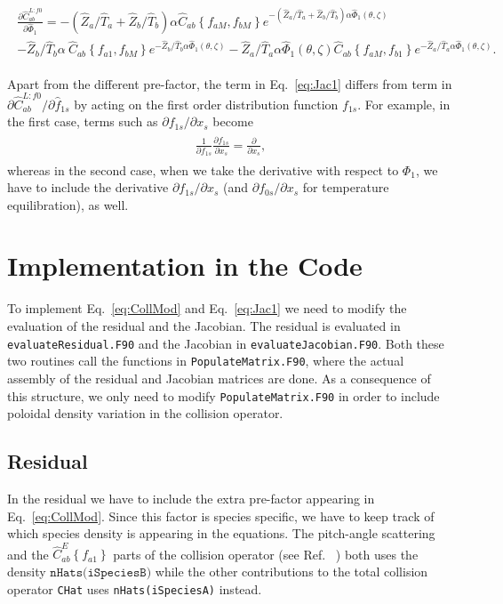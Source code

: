\documentclass[12pt]{article}
\newcommand{\eq}[1]{\begin{align*}\begin{gathered}#1\end{gathered}\end{align*}}
\newcommand{\eqre}[1]{\begin{align}\begin{gathered}#1\end{gathered}\end{align}}
\begin{document}
\eqre{
\label{eq:Jac1}
\frac{\partial \hat C_{ab}^{L:f0}}{\partial \hat \Phi_1} = -\left(\hat Z_a/\hat T_a + \hat Z_b/\hat T_b\right) \alpha \hat C_{ab}\left\{f_{aM},f_{bM}\right\}e^{-\left(\hat Z_a/\hat T_a + \hat Z_b/\hat T_b\right) \alpha\hat\Phi_1(\theta,\zeta)}  \\ -\hat Z_b/\hat T_b \alpha\ \hat C_{ab}\left\{f_{a1},f_{bM}\right\}e^{-\hat Z_b/\hat T_b \alpha\hat\Phi_1(\theta,\zeta)}  - \hat Z_a/\hat T_a\alpha\hat\Phi_1(\theta,\zeta) \hat C_{ab}\left\{f_{aM},f_{b1}\right\}e^{-\hat Z_a/\hat T_a\alpha\hat\Phi_1(\theta,\zeta)}.
}

\noindent
Apart from the different pre-factor, the term in Eq.~\eqref{eq:Jac1} differs from term in $\partial \hat C_{ab}^{L:f0}/\partial \hat f_{1s}$ by acting on the first order distribution function $f_{1s}$. For example, in the first case, terms such as $\partial f_{1s}/\partial x_s$ become 
\eq{
\frac{1}{\partial f_{1s}}\frac{\partial f_{1s}}{\partial x_s} = \frac{\partial}{\partial x_s},
}
whereas in the second case, when we take the derivative with respect to $\Phi_1$, we have to include the derivative $\partial f_{1s}/\partial x_s$ (and $\partial f_{0s}/\partial x_s$ for temperature equilibration), as well.


\section*{Implementation in the Code}
To implement Eq.~\eqref{eq:CollMod} and Eq.~\eqref{eq:Jac1} we need to modify the evaluation of the residual and the Jacobian. The residual is evaluated in \texttt{evaluateResidual.F90} and the Jacobian in \texttt{evaluateJacobian.F90}. Both these two routines call the functions in \texttt{PopulateMatrix.F90}, where the actual assembly of the residual and Jacobian matrices are done. As a consequence of this structure, we only need to modify \texttt{PopulateMatrix.F90} in order to include poloidal density variation in the collision operator.

\subsection*{Residual}
\label{sec:Res}
In the residual we have to include the extra pre-factor appearing in Eq.~\eqref{eq:CollMod}. Since this factor is species specific, we have to keep track of which species density is appearing in the equations. The pitch-angle scattering and the $\hat C^E_{ab}\left \{f_{a1}\right \}$ parts of the collision operator (see Ref. ~\cite{ref:Coll1}) both uses the density $\texttt{nHats(iSpeciesB)}$ while the other contributions to the total collision operator \texttt{CHat} uses \texttt{nHats(iSpeciesA)} instead. 
\end{document}
